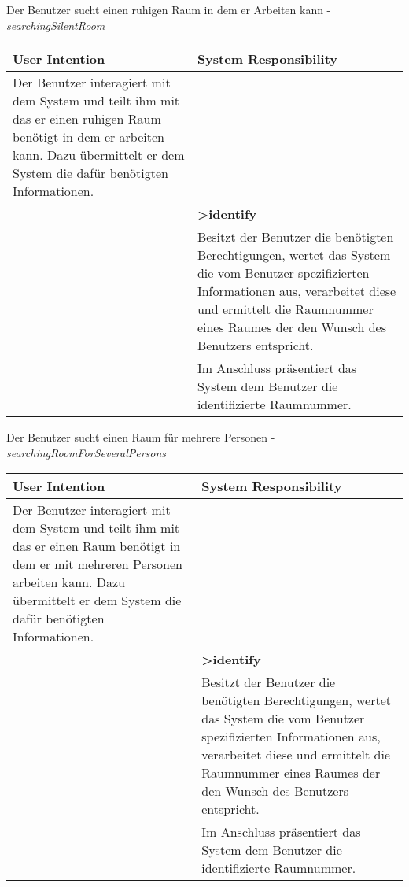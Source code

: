 \begin{table}[h]
	Der Benutzer sucht einen ruhigen Raum in dem er Arbeiten kann - \textit{searchingSilentRoom}\\
	\begin{tabularx}{\textwidth}{|X|X|}
	\rowcolor{heading} \textbf{User Intention} & \textbf{System Responsibility}\\ \hline
	Der Benutzer interagiert mit dem System und teilt ihm mit das er einen ruhigen Raum benötigt in dem er arbeiten kann. Dazu übermittelt er dem System die dafür benötigten Informationen. & \\  \hline
	 & \textbf{>identify} \\ \hline
	 & Besitzt der Benutzer die benötigten Berechtigungen, wertet das System die vom Benutzer spezifizierten Informationen aus, verarbeitet diese und ermittelt die Raumnummer eines Raumes der den Wunsch des Benutzers entspricht.\\ \hline
	 & Im Anschluss präsentiert das System dem Benutzer die identifizierte Raumnummer.\\ \hline
	\end{tabularx}
	
	Der Benutzer sucht einen Raum für mehrere Personen - \textit{searchingRoomForSeveralPersons}\\
	\begin{tabularx}{\textwidth}{|X|X|}
	\rowcolor{heading} \textbf{User Intention} & \textbf{System Responsibility}\\ \hline
	Der Benutzer interagiert mit dem System und teilt ihm mit das er einen Raum benötigt in dem er mit mehreren Personen arbeiten kann. Dazu übermittelt er dem System die dafür benötigten Informationen. & \\  \hline
	 & \textbf{>identify} \\ \hline
	 & Besitzt der Benutzer die benötigten Berechtigungen, wertet das System die vom Benutzer spezifizierten Informationen aus, verarbeitet diese und ermittelt die Raumnummer eines Raumes der den Wunsch des Benutzers entspricht.\\ \hline
	 & Im Anschluss präsentiert das System dem Benutzer die identifizierte Raumnummer.\\ \hline
	\end{tabularx}
\end{table}


